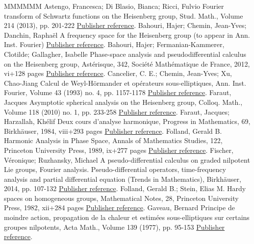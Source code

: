 \begin{thebibliography}{MMMMMM}
 Astengo, Francesca; Di Blasio, Bianca; Ricci, Fulvio Fourier transform of Schwartz functions on the Heisenberg group, Stud. Math., Volume 214 (2013), pp. 201-222 \href{https://ahl.centre-mersenne.org/item/AHL_2018__1__1_0/#astengo2}{Publisher reference}.
 Bahouri, Hajer; Chemin, Jean-Yves; Danchin, Raphaël A frequency space for the Heisenberg group (to appear in Ann. Inst. Fourier) \href{https://ahl.centre-mersenne.org/item/AHL_2018__1__1_0/#bcdFHspace}{Publisher reference}.
 Bahouri, Hajer; Fermanian-Kammerer, Clotilde; Gallagher, Isabelle Phase-space analysis and pseudodifferential calculus on the Heisenberg group, Astérisque, 342, Société Mathématique de France, 2012, vi+128 pages \href{https://ahl.centre-mersenne.org/item/AHL_2018__1__1_0/#bfg}{Publisher reference}.
 Cancelier, C. E.; Chemin, Jean-Yves; Xu, Chao-Jiang Calcul de Weyl-Hörmander et opérateurs sous-elliptiques, Ann. Inst. Fourier, Volume 43 (1993) no. 4, pp. 1157-1178 \href{https://ahl.centre-mersenne.org/item/AHL_2018__1__1_0/#CCX}{Publisher reference}.
 Faraut, Jacques Asymptotic spherical analysis on the Heisenberg group, Colloq. Math., Volume 118 (2010) no. 1, pp. 233-258 \href{https://ahl.centre-mersenne.org/item/AHL_2018__1__1_0/#F}{Publisher reference}.
 Faraut, Jacques; Harzallah, Khélif Deux cours d’analyse harmonique, Progress in Mathematics, 69, Birkhäuser, 1984, viii+293 pages \href{https://ahl.centre-mersenne.org/item/AHL_2018__1__1_0/#farautharzallah}{Publisher reference}.
 Folland, Gerald B. Harmonic Analysis in Phase Space, Annals of Mathematics Studies, 122, Princeton University Press, 1989, ix+277 pages \href{https://ahl.centre-mersenne.org/item/AHL_2018__1__1_0/#folland}{Publisher reference}.
 Fischer, Véronique; Ruzhansky, Michael A pseudo-differential calculus on graded nilpotent Lie groups, Fourier analysis. Pseudo-differential operators, time-frequency analysis and partial differential equation (Trends in Mathematics), Birkhäuser, 2014, pp. 107-132 \href{https://ahl.centre-mersenne.org/item/AHL_2018__1__1_0/#fisher}{Publisher reference}.
 Folland, Gerald B.; Stein, Elias M. Hardy spaces on homogeneous groups, Mathematical Notes, 28, Princeton University Press, 1982, xii+284 pages \href{https://ahl.centre-mersenne.org/item/AHL_2018__1__1_0/#follandstein}{Publisher reference}.
 Gaveau, Bernard Principe de moindre action, propagation de la chaleur et estimées sous-elliptiques sur certains groupes nilpotents, Acta Math., Volume 139 (1977), pp. 95-153 \href{https://ahl.centre-mersenne.org/item/AHL_2018__1__1_0/#gaveau}{Publisher reference}.

\end{thebibliography}
